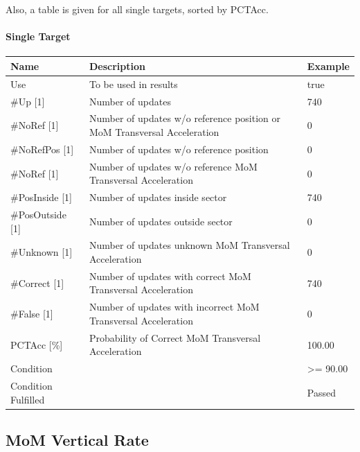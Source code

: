 Also, a table is given for all single targets, sorted by PCTAcc.

\paragraph{Single Target}

\begin{center}
 \begin{table}[H]
  \begin{tabularx}{\textwidth}{ | l | X |  l | }
    \hline
    \textbf{Name} & \textbf{Description} & \textbf{Example} \\ \hline
    Use & To be used in results & true \\ \hline
    \#Up [1] & Number of updates & 740 \\ \hline
    \#NoRef [1] & Number of updates w/o reference position or MoM Transversal Acceleration & 0 \\ \hline
    \#NoRefPos [1] & Number of updates w/o reference position  & 0 \\ \hline
    \#NoRef [1] & Number of updates w/o reference MoM Transversal Acceleration & 0 \\ \hline
    \#PosInside [1] & Number of updates inside sector & 740 \\ \hline
    \#PosOutside [1] & Number of updates outside sector & 0 \\ \hline
    \#Unknown [1] & Number of updates unknown MoM Transversal Acceleration & 0 \\ \hline
    \#Correct [1] & Number of updates with correct MoM Transversal Acceleration & 740 \\ \hline
    \#False [1] & Number of updates with incorrect MoM Transversal Acceleration & 0 \\ \hline
    PCTAcc [\%] & Probability of Correct MoM Transversal Acceleration & 100.00 \\ \hline
    Condition &  & >= 90.00 \\ \hline
    Condition Fulfilled &  & Passed \\ \hline
\end{tabularx}
\end{table}
\end{center}


\subsection{MoM Vertical Rate}
\label{sec:eval_req_mom_vert}

